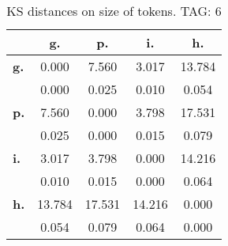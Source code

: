 \begin{table}[h!]
\begin{center}
\begin{tabular}{| l || c | c | c | c |}\hline
 & {\bf g.} & {\bf p.} & {\bf i.} & {\bf h.} \\\hline\hline
{\bf g.} & 0.000 & 7.560 & 3.017 & 13.784 \\
{\bf } & 0.000 & 0.025 & 0.010 & 0.054 \\\hline
{\bf p.} & 7.560 & 0.000 & 3.798 & 17.531 \\
{\bf } & 0.025 & 0.000 & 0.015 & 0.079 \\\hline
{\bf i.} & 3.017 & 3.798 & 0.000 & 14.216 \\
{\bf } & 0.010 & 0.015 & 0.000 & 0.064 \\\hline
{\bf h.} & 13.784 & 17.531 & 14.216 & 0.000 \\
{\bf } & 0.054 & 0.079 & 0.064 & 0.000 \\\hline
\end{tabular}
\caption{KS distances on size of tokens. TAG: 6}
\end{center}
\end{table}